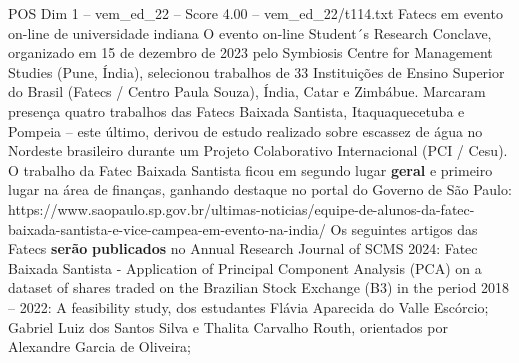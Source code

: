 \begin{textsample}{POS Dim 1 – vem\_ed\_22 – Score 4.00 – vem\_ed\_22/t114.txt}  \label{ex:f1_pos_175}
Fatecs em evento on-line de universidade indiana O evento on-line Student´s Research Conclave, organizado em 15 de dezembro de 2023 pelo Symbiosis Centre for Management Studies (Pune, Índia), selecionou trabalhos de 33 Instituições de Ensino Superior do Brasil (Fatecs / Centro Paula Souza), Índia, Catar e Zimbábue.
Marcaram presença quatro trabalhos das Fatecs Baixada Santista, Itaquaquecetuba e Pompeia – este último, derivou de estudo realizado sobre escassez de água no Nordeste brasileiro durante um Projeto Colaborativo Internacional (PCI / Cesu).
O trabalho da Fatec Baixada Santista ficou em segundo lugar \textbf{geral} e primeiro lugar na área de finanças, ganhando destaque no portal do Governo de São Paulo: https://www.saopaulo.sp.gov.br/ultimas-noticias/equipe-de-alunos-da-fatec-baixada-santista-e-vice-campea-em-evento-na-india/ Os seguintes artigos das Fatecs \textbf{serão} \textbf{publicados} no Annual Research Journal of SCMS 2024: Fatec Baixada Santista - Application of Principal Component Analysis (PCA) on a dataset of shares traded on the Brazilian Stock Exchange (B3) in the period 2018 – 2022: A feasibility study, dos estudantes Flávia Aparecida do Valle Escórcio; Gabriel Luiz dos Santos Silva e Thalita Carvalho Routh, orientados por Alexandre Garcia de Oliveira;

\end{textsample}
